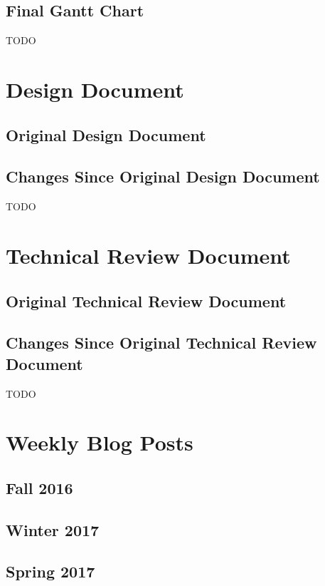 \documentclass[letterpaper,10pt]{article}
\begin{document}
\subsection{Final Gantt Chart}
TODO


\section{Design Document}
\subsection{Original Design Document}


\subsection{Changes Since Original Design Document}
TODO


\section{Technical Review Document}
\subsection{Original Technical Review Document}


\subsection{Changes Since Original Technical Review Document}
TODO


\section{Weekly Blog Posts}
\subsection{Fall 2016}


\subsection{Winter 2017}


\subsection{Spring 2017}

\end{document}

